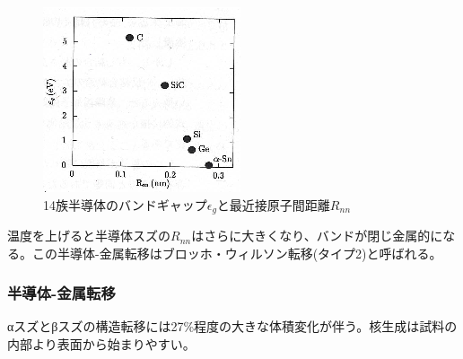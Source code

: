 \begin{figure}[!h]
\begin{minipage}{0.6\hsize}
\begin{center}
   \includegraphics[width=\hsize]{Introduction/bandgaps.eps}
  \end{center}
  \caption{14族半導体のバンドギャップ$\epsilon_g$と最近接原子間距離$R_{nn}$\cite{Yonezawa}}
  \label{fig:bandgaps}
 \end{minipage}
\end{figure}

温度を上げると半導体スズの$R_{nn}$はさらに大きくなり、バンドが閉じ金属的になる。この半導体-金属転移はブロッホ・ウィルソン転移(タイプ2)と呼ばれる\cite{Yonezawa}。

\subsubsection{半導体-金属転移}
αスズとβスズの構造転移には27\%程度の大きな体積変化が伴う。核生成は試料の内部より表面から始まりやすい\cite{Cornelius}。


